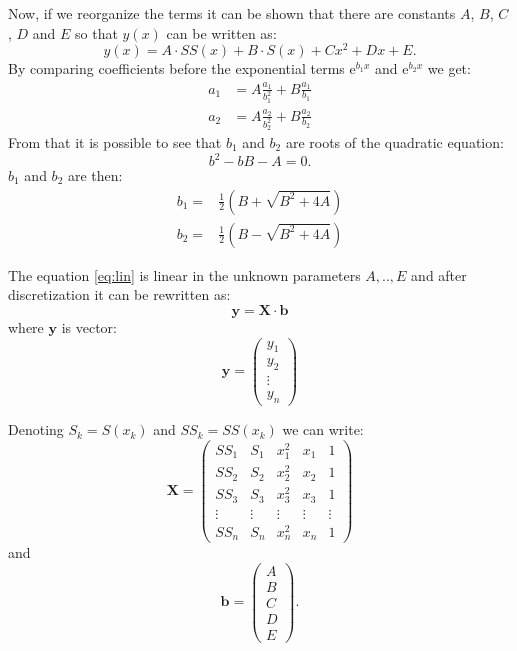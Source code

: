 Now, if we reorganize the terms it can be shown that there are constants $A$, $B$, $C$, $D$ and $E$ so that $y(x)$ can be written as:
\begin{equation}
	\label{eq:lin}
	y(x) = A\cdot SS(x)+B\cdot S(x) + C x^2 + Dx + E.
\end{equation}
By comparing coefficients before the exponential terms $\mathrm{e}^{b_1 x}$ and $\mathrm{e}^{b_2 x}$ we get:
\begin{align}
	a_1 & = A\frac{a_1}{b_1^2} + B\frac{a_1}{b_1}  \\
	a_2 & = A\frac{a_2}{b_2^2} + B\frac{a_2}{b_2}
\end{align}
From that it is possible to see that $b_1$ and $b_2$ are roots of the quadratic equation:
\begin{equation}
	\label{eq:quadratic}
	b^2 - bB - A = 0.
\end{equation}
$b_1$ and $b_2$ are then:
\begin{align}
	\label{eq:roots}
	b_1 = & \frac{1}{2}\left(B + \sqrt{B^2 + 4A}\right) \\
	b_2 = & \frac{1}{2}\left(B - \sqrt{B^2 + 4A}\right)
\end{align}

The equation \ref{eq:lin} is linear in the unknown parameters $A,..,E$ and after discretization it can be rewritten as: 
\begin{equation}
	\label{eq:lin-vec}
	\boldsymbol{y}=\boldsymbol{X}\cdot \boldsymbol{b}
\end{equation}
where $\boldsymbol{y}$ is vector:
\begin{equation}
	\boldsymbol{y} =
	\begin{pmatrix}
		y_1 \\
		y_2 \\
		\vdots \\
		y_n  
	\end{pmatrix}
\end{equation} 	

Denoting $S_k=S(x_k)$ and $SS_k=SS(x_k)$ we can write:
\begin{equation}
	\boldsymbol{X} =
	\begin{pmatrix}
		SS_1 & S_1 & x_1^2 & x_1 & 1 \\
		SS_2 & S_2 & x_2^2 & x_2 & 1 \\
		SS_3 & S_3 & x_3^2 & x_3 & 1 \\
		\vdots & \vdots & \vdots & \vdots & \vdots \\
		SS_n & S_n & x_n^2 & x_n & 1  
	\end{pmatrix}
\end{equation}
and 
\begin{equation}
	\boldsymbol{b} =
	\begin{pmatrix}
		A \\
		B \\
		C \\
		D \\
		E  
	\end{pmatrix}.
\end{equation}

